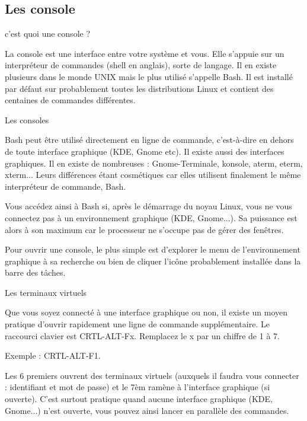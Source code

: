 \documentclass[10pt]{beamer}
\begin{document}
\subsection{Les console}
\begin{frame}[fragile]{c'est quoi une console ?}

La console est une interface entre votre système et vous. Elle s'appuie sur un
interpréteur de commandes (shell en anglais), sorte de langage. Il en existe
plusieurs dans le monde UNIX mais le plus utilisé s'appelle Bash. Il est installé par
défaut sur probablement toutes les distributions Linux et contient des centaines de
commandes différentes.

\end{frame}


\begin{frame}[fragile]{Les consoles}

Bash peut être utilisé directement en ligne de commande, c'est-à-dire en dehors de
toute interface graphique (KDE, Gnome etc). Il existe aussi des interfaces graphiques. Il en existe de nombreuses : Gnome-Terminale, konsole, aterm, eterm, xterm... Leurs différences étant cosmétiques car elles utilisent finalement le même interpréteur de commande, Bash.

Vous accédez ainsi à Bash si, après le démarrage du noyau Linux, vous ne vous connectez pas à un environnement graphique (KDE, Gnome...). Sa puissance est alors à son maximum car le processeur ne s'occupe pas de gérer des fenêtres. 

Pour ouvrir une console, le plus simple est d'explorer le menu de l'environnement graphique à sa recherche ou bien de cliquer l'icône probablement installée dans la barre des tâches.
\end{frame}


\begin{frame}{Les terminaux virtuels}

Que vous soyez connecté à une interface graphique ou non, il existe un moyen
pratique d'ouvrir rapidement une ligne de commande supplémentaire. Le raccourci
clavier est CRTL-ALT-Fx. Remplacez le x par un chiffre de 1 à 7.

Exemple : \alert{CRTL-ALT-F1}. 

Les 6 premiers ouvrent des terminaux virtuels (auxquels il faudra vous connecter : identifiant et mot de passe) et le 7èm ramène à l'interface graphique (si ouverte). C'est surtout pratique quand aucune interface graphique (KDE, Gnome...) n'est ouverte, vous pouvez ainsi lancer en parallèle des commandes.
\end{frame}
\end{document}
